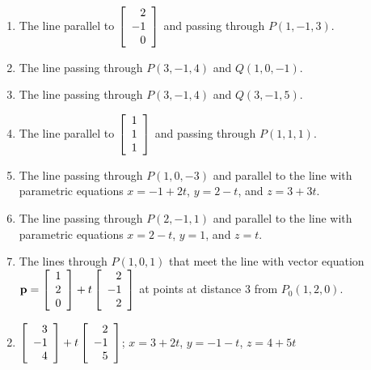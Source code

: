 \begin{multicols}{2}
\begin{ex}
\begin{enumerate}[label={\alph*.}]
\item The line parallel to 
$\left[
\begin{array}{r}
2\\
-1\\
0
\end{array}
\right]$
 and passing through $P(1, -1, 3)$.

\item The line passing through $P(3, -1, 4)$ and $Q(1, 0, -1)$.

\item The line passing through $P(3, -1, 4)$ and $Q(3, -1, 5)$.

\item The line parallel to 
$\left[
\begin{array}{r}
1\\
1\\
1
\end{array}
\right]$
and passing through $P(1, 1, 1)$.

\item The line passing through $P(1, 0, -3)$ and parallel to the line with parametric equations $x = -1 + 2t$, $y = 2 - t$, and $z = 3 + 3t$.

\item The line passing through $P(2, -1, 1)$ and parallel to the line with parametric equations $x = 2 - t$, $y = 1$, and $z = t$.

\item The lines through $P(1, 0, 1)$ that meet the line with vector equation 
$\textbf{p} = \left[
\begin{array}{r}
1\\
2\\
0
\end{array}
\right]
+ t
\left[
\begin{array}{r}
2\\
-1\\
2
\end{array}
\right]$
 at points at distance 3 from $P_{0}(1, 2, 0)$.

\end{enumerate}
\begin{sol}
\begin{enumerate}[label={\alph*.}]
\setcounter{enumi}{1}
\item 
$\left[
\begin{array}{r}
3\\
-1\\
4
\end{array}
\right]
+ t
\left[
\begin{array}{r}
2\\
-1\\
5
\end{array}
\right]$;
$x = 3 + 2t$, $y = -1 -t$, $z = 4 + 5t$


\end{enumerate}
\end{sol}
\end{ex}
\end{multicols}

